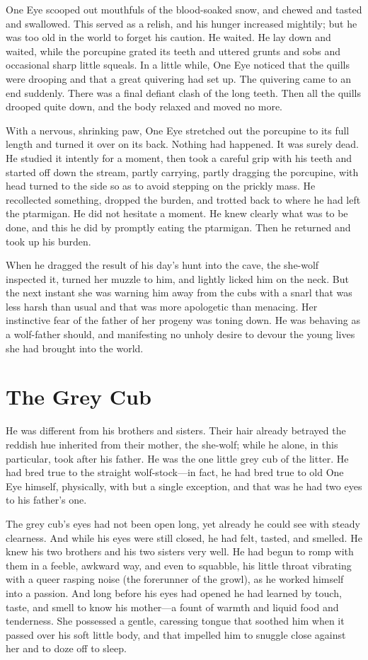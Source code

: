 \documentclass[10pt]{book}
\begin{document}
One Eye scooped out mouthfuls of the blood-soaked snow, and chewed and
tasted and swallowed. This served as a relish, and his hunger increased
mightily; but he was too old in the world to forget his caution. He
waited. He lay down and waited, while the porcupine grated its teeth
and uttered grunts and sobs and occasional sharp little squeals. In a
little while, One Eye noticed that the quills were drooping and that a
great quivering had set up. The quivering came to an end suddenly.
There was a final defiant clash of the long teeth. Then all the quills
drooped quite down, and the body relaxed and moved no more.

With a nervous, shrinking paw, One Eye stretched out the porcupine to
its full length and turned it over on its back. Nothing had happened.
It was surely dead. He studied it intently for a moment, then took a
careful grip with his teeth and started off down the stream, partly
carrying, partly dragging the porcupine, with head turned to the side
so as to avoid stepping on the prickly mass. He recollected something,
dropped the burden, and trotted back to where he had left the
ptarmigan. He did not hesitate a moment. He knew clearly what was to be
done, and this he did by promptly eating the ptarmigan. Then he
returned and took up his burden.

When he dragged the result of his day’s hunt into the cave, the
she-wolf inspected it, turned her muzzle to him, and lightly licked him
on the neck. But the next instant she was warning him away from the
cubs with a snarl that was less harsh than usual and that was more
apologetic than menacing. Her instinctive fear of the father of her
progeny was toning down. He was behaving as a wolf-father should, and
manifesting no unholy desire to devour the young lives she had brought
into the world.

\chapter{The Grey Cub}

He was different from his brothers and sisters. Their hair already
betrayed the reddish hue inherited from their mother, the she-wolf;
while he alone, in this particular, took after his father. He was the
one little grey cub of the litter. He had bred true to the straight
wolf-stock—in fact, he had bred true to old One Eye himself,
physically, with but a single exception, and that was he had two eyes
to his father’s one.

The grey cub’s eyes had not been open long, yet already he could see
with steady clearness. And while his eyes were still closed, he had
felt, tasted, and smelled. He knew his two brothers and his two sisters
very well. He had begun to romp with them in a feeble, awkward way, and
even to squabble, his little throat vibrating with a queer rasping
noise (the forerunner of the growl), as he worked himself into a
passion. And long before his eyes had opened he had learned by touch,
taste, and smell to know his mother—a fount of warmth and liquid food
and tenderness. She possessed a gentle, caressing tongue that soothed
him when it passed over his soft little body, and that impelled him to
snuggle close against her and to doze off to sleep.
\end{document}
